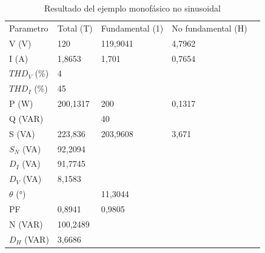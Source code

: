 \begin{table}[H]
\begin{tabular}{|l|l|l|l|l}
\cline{1-4}
Parametro & Total (T)      & Fundamental (1)            & No fundamental (H)               &  \\ \cline{1-4}
V (V)     & 120            & 119,9041                   & 4,7962                           &  \\ \cline{1-4}
I (A)     & 1,8653         & 1,701                      & 0,7654                           &  \\ \cline{1-4}
$THD_{V}$ (\%) & 4              & \multicolumn{1}{c|}{\cellcolor[HTML]{C0C0C0}} & \multicolumn{1}{c|}{\cellcolor[HTML]{C0C0C0}} &  \\ \cline{1-4}
$THD_{I}$ (\%) & 45             & \multicolumn{1}{c|}{\cellcolor[HTML]{C0C0C0}} & \multicolumn{1}{c|}{\cellcolor[HTML]{C0C0C0}} &  \\ \cline{1-4}
P (W)     & 200,1317       & 200                        & 0,1317                           &  \\ \cline{1-4}
Q (VAR)   & \multicolumn{1}{c|}{\cellcolor[HTML]{C0C0C0}} & 40                         & \multicolumn{1}{c|}{\cellcolor[HTML]{C0C0C0}} &  \\ \cline{1-4}
S (VA)    & 223,836        & 203,9608                   & 3,671                            &  \\ \cline{1-4}
$S_{N}$ (VA)   & 92,2094        & \multicolumn{1}{c|}{\cellcolor[HTML]{C0C0C0}} & \multicolumn{1}{c|}{\cellcolor[HTML]{C0C0C0}} &  \\ \cline{1-4}
$D_{I}$ (VA)   & 91,7745        & \multicolumn{1}{c|}{\cellcolor[HTML]{C0C0C0}} & \multicolumn{1}{c|}{\cellcolor[HTML]{C0C0C0}} &  \\ \cline{1-4}
$D_{V}$ (VA)   & 8,1583         & \multicolumn{1}{c|}{\cellcolor[HTML]{C0C0C0}} & \multicolumn{1}{c|}{\cellcolor[HTML]{C0C0C0}} &  \\ \cline{1-4}
$\theta$ (°)  & \multicolumn{1}{c|}{\cellcolor[HTML]{C0C0C0}} & 11,3044                    & \multicolumn{1}{c|}{\cellcolor[HTML]{C0C0C0}} &  \\ \cline{1-4}
PF        & 0,8941         & 0,9805                     & \multicolumn{1}{c|}{\cellcolor[HTML]{C0C0C0}} &  \\ \cline{1-4}
N (VAR)   & 100,2489       & \multicolumn{1}{c|}{\cellcolor[HTML]{C0C0C0}} & \multicolumn{1}{c|}{\cellcolor[HTML]{C0C0C0}} &  \\ \cline{1-4}
$D_{H}$ (VAR)  & 3,6686         & \multicolumn{1}{c|}{\cellcolor[HTML]{C0C0C0}} & \multicolumn{1}{c|}{\cellcolor[HTML]{C0C0C0}} &  \\ \cline{1-4}
\end{tabular}
\caption{Resultado del ejemplo monofásico no sinusoidal}
\label{tab:resultados-monofasico}
\end{table}

